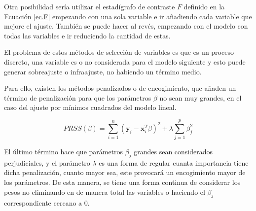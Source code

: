 \noindent Otra posibilidad sería utilizar el estadígrafo de contraste $F$ definido en la Ecuación \eqref{ec.F} empezando con una sola variable e ir añadiendo cada variable que mejore el ajuste. También se puede hacer al revés, empezando con el modelo con todas las variables e ir reduciendo la cantidad de estas. 

\noindent El problema de estos métodos de selección de variables es que es un proceso discreto, una variable es o no considerada para el modelo siguiente y esto puede generar sobreajuste o infraajuste, no habiendo un término medio. 

\noindent Para ello, existen los métodos penalizados o de encogimiento, que añaden un término de penalización para que los parámetros $\beta$ no sean muy grandes, en el caso del ajuste por mínimos cuadrados del modelo lineal. 

\begin{equation}
PRSS(\beta)=\sum_{i=1}^n(\textbf{y}_i-\textbf{x}_i^T\beta)^2+\lambda\sum_{j=1}^p\beta_j^2
\end{equation}

\noindent El último término hace que parámetros $\beta_j$ grandes sean considerados perjudiciales, y el parámetro $\lambda$ es una forma de regular cuanta importancia tiene dicha penalización, cuanto mayor sea, este provocará un encogimiento mayor de los parámetros. 
De esta manera, se tiene una forma continua de considerar los pesos no eliminando en de manera total las variables o haciendo el $\beta_j$ correspondiente cercano a 0. 















